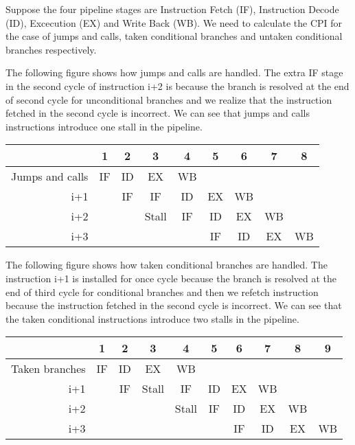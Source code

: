 \documentclass{article}
\begin{document}
Suppose the four pipeline stages are Instruction Fetch (IF), Instruction Decode (ID), Excecution (EX) and Write Back (WB). We need to calculate the CPI for the case of jumps and calls, taken conditional branches and untaken conditional branches respectively.

The following figure shows how jumps and calls are handled. The extra IF stage in the second cycle of instruction i+2 is because the branch is resolved at the end of second cycle for unconditional branches and we realize that the instruction fetched in the second cycle is incorrect. We can see that jumps and calls instructions introduce one stall in the pipeline.

\begin{table}[ht!]
\begin{center}
\begin{tabular}{r|c|c|c|c|c|c|c|c} %
    \toprule
    &\textbf{1}&\textbf{2}&\textbf{3}&\textbf{4}&\textbf{5}&\textbf{6}&\textbf{7}&\textbf{8}\\
    \hline
    Jumps and calls&IF&ID&EX&WB&&&\\
    \hline
    i+1&&IF&IF&ID&EX&WB&\\
    \hline
    i+2&&&Stall&IF&ID&EX&WB&\\
    \hline
    i+3&&&&&IF&ID&EX&WB\\
    \bottomrule
    \end{tabular}
\end{center}
\end{table}

The following figure shows how taken conditional branches are handled. The instruction i+1 is installed for once cycle because the branch is resolved at the end of third cycle for conditional branches and then we refetch instruction because the instruction fetched in the second cycle is incorrect. We can see that the taken conditional instructions introduce two stalls in the pipeline.

\begin{table}[ht!]
\begin{center}
\begin{tabular}{r|c|c|c|c|c|c|c|c|c} %
    \toprule
    &\textbf{1}&\textbf{2}&\textbf{3}&\textbf{4}&\textbf{5}&\textbf{6}&\textbf{7}&\textbf{8}&\textbf{9}\\
    \hline
    Taken branches&IF&ID&EX&WB&&&&\\
    \hline
    i+1&&IF&Stall&IF&ID&EX&WB&\\
    \hline
    i+2&&&&Stall&IF&ID&EX&WB\\
    \hline
    i+3&&&&&&IF&ID&EX&WB\\
    \bottomrule
    \end{tabular}
\end{center}
\end{table}
\end{document}
